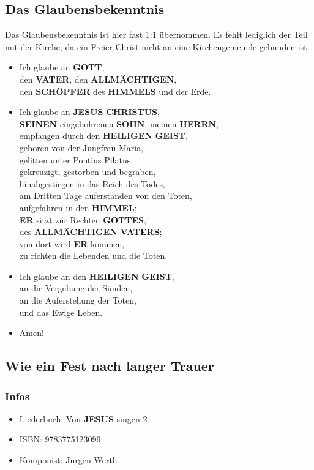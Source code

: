 \documentclass[10pt,a5paper]{article}
\newcommand{\Allmaechtigen}[0]{\textbf{ALLM\"ACHTIGEN}}
\newcommand{\Christus}[0]{\textbf{CHRISTUS}}
\newcommand{\Er}[0]{\textbf{ER}}
\newcommand{\Geist}[0]{\textbf{GEIST}}
\newcommand{\Gottes}[0]{\textbf{GOTTES}}
\newcommand{\Gott}[0]{\textbf{GOTT}}
\newcommand{\Heiligen}[0]{\textbf{HEILIGEN}}
\newcommand{\Herrn}[0]{\textbf{HERRN}}
\newcommand{\Himmel}[0]{\textbf{HIMMEL}}
\newcommand{\Himmels}[0]{\textbf{HIMMELS}}
\newcommand{\Jesus}[0]{\textbf{JESUS}}
\newcommand{\Schoepfer}[0]{\textbf{SCH\"OPFER}}
\newcommand{\Seinen}[0]{\textbf{SEINEN}}
\newcommand{\Sohn}[0]{\textbf{SOHN}}
\newcommand{\Vater}[0]{\textbf{VATER}}
\newcommand{\Vaters}[0]{\textbf{VATERS}}
\begin{document}
	\subsection{Das Glaubensbekenntnis}
		Das Glaubensbekenntnis ist hier fast 1:1 \"ubernommen.
		Es fehlt lediglich der Teil mit der Kirche,
		da ein Freier Christ nicht an eine Kirchengemeinde gebunden ist.
		\\
		\begin{itemize}[nosep]
			\item	Ich glaube an {\Gott},
			\\		den {\Vater},
					den {\Allmaechtigen},
			\\		den {\Schoepfer} des {\Himmels} und der Erde.
			\item	Ich glaube an {\Jesus} {\Christus},
			\\		{\Seinen} eingebohrenen {\Sohn},
					meinen {\Herrn},
			\\		empfangen durch den {\Heiligen} {\Geist},
			\\		geboren von der Jungfrau Maria,
			\\		gelitten unter Pontius Pilatus,
			\\		gekreuzigt,
					gestorben und begraben,
			\\		hinabgestiegen in das Reich des Todes,
			\\		am Dritten Tage auferstanden von den Toten,
			\\		aufgefahren in den {\Himmel};
			\\		{\Er} sitzt zur Rechten {\Gottes},
			\\		des {\Allmaechtigen} {\Vaters};
			\\		von dort wird {\Er} kommen,
			\\		zu richten die Lebenden und die Toten.
			\item	Ich glaube an den {\Heiligen} {\Geist},
			\\		an die Vergebung der S\"unden,
			\\		an die Auferstehung der Toten,
			\\		und das Ewige Leben.
			\item	Amen!
		\end{itemize}
		
	\subsection{Wie ein Fest nach langer Trauer}
		\subsubsection{Infos}
			\begin{itemize}[nosep]
				\item Liederbuch: Von {\Jesus} singen 2
				\item ISBN: 9783775123099
				\item Komponist: J\"urgen Werth
			\end{itemize}
		
\end{document}
